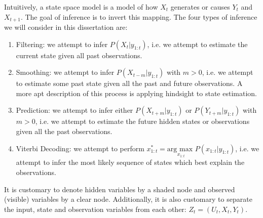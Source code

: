 \documentclass[../masters.tex]{subfiles}
\begin{document}
Intuitively, a state space model is a model of how $X_t$ generates or causes $Y_t$ and $X_{t+1}$. The goal of inference is to invert this mapping. The four types of inference we will consider in this dissertation are:
\begin{enumerate}
\item
Filtering: we attempt to infer $P(X_t|y_{1:t})$, i.e. we attempt to estimate the current state given all past observations.
\item
Smoothing: we attempt to infer $P(X_{t-m}|y_{1:t})$ with $m > 0$, i.e. we attempt to estimate some past state given all the past and future observations. A more apt description of this process is applying hindsight to state estimation.
\item
Prediction: we attempt to infer either $P(X_{t+m}|y_{1:t})$ or $P(Y_{t+m}|y_{1:t})$ with $m>0$, i.e. we attempt to estimate the future hidden states or observations given all the past observations.
\item
Viterbi Decoding: we attempt to perform $x_{1:t}^* = \underset{x_{1:t}}{\text{arg max }} P(x_{1:t}|y_{1:t})$, i.e. we attempt to infer the most likely sequence of states which best explain the observations.
\end{enumerate}
It is customary to denote hidden variables by a shaded node and observed (visible) variables by a clear node. Additionally, it is also customary to separate the input, state and observation variables from each other: $Z_t = (U_t, X_t, Y_t)$. 
\end{document}
